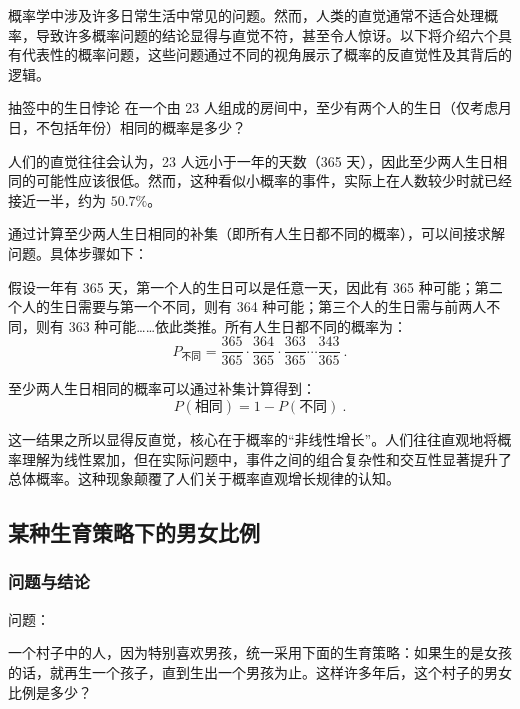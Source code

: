 
概率学中涉及许多日常生活中常见的问题。然而，人类的直觉通常不适合处理概率，导致许多概率问题的结论显得与直觉不符，甚至令人惊讶。以下将介绍六个具有代表性的概率问题，这些问题通过不同的视角展示了概率的反直觉性及其背后的逻辑。

\begin{example}{抽签中的生日悖论}
在一个由 23 人组成的房间中，至少有两个人的生日（仅考虑月日，不包括年份）相同的概率是多少？
\end{example}

人们的直觉往往会认为，23 人远小于一年的天数（365 天），因此至少两人生日相同的可能性应该很低。然而，这种看似小概率的事件，实际上在人数较少时就已经接近一半，约为 $50.7\%$。

通过计算至少两人生日相同的补集（即所有人生日都不同的概率），可以间接求解问题。具体步骤如下：

假设一年有 365 天，第一个人的生日可以是任意一天，因此有 365 种可能；第二个人的生日需要与第一个不同，则有 364 种可能；第三个人的生日需与前两人不同，则有 363 种可能……依此类推。所有人生日都不同的概率为：
\begin{equation}
P_{\text{不同}} = \frac{365}{365} \cdot \frac{364}{365} \cdot \frac{363}{365} \cdots \frac{343}{365}~.
\end{equation}

至少两人生日相同的概率可以通过补集计算得到：
\begin{equation}
P(\text{相同}) = 1 - P(\text{不同})~.
\end{equation}


这一结果之所以显得反直觉，核心在于概率的“非线性增长”。人们往往直观地将概率理解为线性累加，但在实际问题中，事件之间的组合复杂性和交互性显著提升了总体概率。这种现象颠覆了人们关于概率直观增长规律的认知。

\subsection{某种生育策略下的男女比例}

\subsubsection{问题与结论}

问题：

一个村子中的人，因为特别喜欢男孩，统一采用下面的生育策略：如果生的是女孩的话，就再生一个孩子，直到生出一个男孩为止。这样许多年后，这个村子的男女比例是多少？

